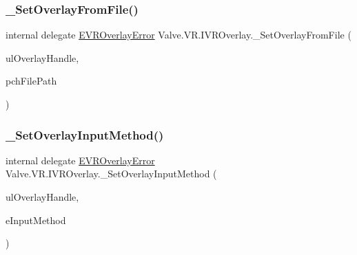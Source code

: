 \mbox{\label{struct_valve_1_1_v_r_1_1_i_v_r_overlay_a7651c5d114e08eb5cd7813524caf5220}} 
\subsubsection{\texorpdfstring{\_SetOverlayFromFile()}{\_SetOverlayFromFile()}}
{\footnotesize\ttfamily internal delegate \mbox{\hyperlink{namespace_valve_1_1_v_r_aaee5c5144f42b7969d45b854f51b0c18}{E\+V\+R\+Overlay\+Error}} Valve.\+V\+R.\+I\+V\+R\+Overlay.\+\_\+\+Set\+Overlay\+From\+File (\begin{DoxyParamCaption}\item[{ulong}]{ul\+Overlay\+Handle,  }\item[{string}]{pch\+File\+Path }\end{DoxyParamCaption})}

\mbox{\label{struct_valve_1_1_v_r_1_1_i_v_r_overlay_ab00e26696ac1201e4fb257bb32fb2557}} 
\subsubsection{\texorpdfstring{\_SetOverlayInputMethod()}{\_SetOverlayInputMethod()}}
{\footnotesize\ttfamily internal delegate \mbox{\hyperlink{namespace_valve_1_1_v_r_aaee5c5144f42b7969d45b854f51b0c18}{E\+V\+R\+Overlay\+Error}} Valve.\+V\+R.\+I\+V\+R\+Overlay.\+\_\+\+Set\+Overlay\+Input\+Method (\begin{DoxyParamCaption}\item[{ulong}]{ul\+Overlay\+Handle,  }\item[{\mbox{\hyperlink{namespace_valve_1_1_v_r_a43f4e4c6980efb8b0d2a954640203d74}{V\+R\+Overlay\+Input\+Method}}}]{e\+Input\+Method }\end{DoxyParamCaption})}

\mbox{\label{struct_valve_1_1_v_r_1_1_i_v_r_overlay_a4c59154888075e11f6eb2515fa9f3678}} 
